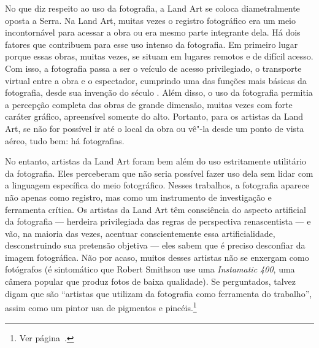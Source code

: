 No que diz respeito ao uso da fotografia, a Land Art se coloca
diametralmente oposta a Serra. Na Land Art, muitas vezes o registro
fotográfico era um meio incontornável para acessar a obra ou era mesmo
parte integrante dela. Há dois fatores que contribuem para esse uso
intenso da fotografia. Em primeiro lugar porque essas obras, muitas
vezes, se situam em lugares remotos e de difícil acesso. Com isso, a
fotografia passa a ser o veículo de acesso privilegiado, o transporte
virtual entre a obra e o espectador, cumprindo uma das funções mais
básicas da fotografia, desde sua invenção do século . Além disso, o
uso da fotografia permitia a percepção completa das obras de grande
dimensão, muitas vezes com forte caráter gráfico, apreensível somente
do alto. Portanto, para os artistas da Land Art, se não for
possível ir até o local da obra ou vê"-la desde um ponto de vista aéreo,
tudo bem: há fotografias.

No entanto, artistas da Land Art foram bem além do uso estritamente
utilitário da fotografia. Eles perceberam que não seria possível fazer
uso dela sem lidar com a linguagem específica do meio fotográfico.
Nesses trabalhos, a fotografia aparece não apenas como registro, mas
como um instrumento de investigação e ferramenta crítica. Os artistas da
Land Art têm consciência do aspecto artificial da fotografia --- herdeira
privilegiada das regras de perspectiva renascentista --- e vão, na
maioria das vezes, acentuar conscientemente essa artificialidade,
desconstruindo sua pretensão objetiva --- eles sabem que é preciso
desconfiar da imagem fotográfica. Não por acaso, muitos desses artistas
não se enxergam como fotógrafos (é sintomático que Robert Smithson use
uma \emph{Instamatic 400}, uma câmera popular que produz fotos de baixa
qualidade). Se perguntados, talvez digam que são ``artistas que utilizam
da fotografia como ferramenta do trabalho'', assim como um pintor usa de
pigmentos e pincéis.\footnote{Ver página~\pageref{ferramenta}.}

